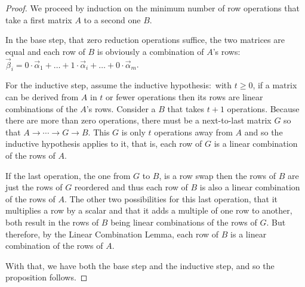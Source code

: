 \begin{proof}
We proceed by induction on the minimum number of row operations that take a
first matrix $A$ to a second one $B$.

In the base step, that
zero reduction operations suffice, the two matrices are equal and each 
row of $B$ is obviously a combination of
$A$'s rows: $\vec{\beta}_i
  =0\cdot\vec{\alpha}_1+\dots+1\cdot\vec{\alpha}_i+\dots+0\cdot\vec{\alpha}_m$.

For the inductive step, assume the inductive hypothesis:~with $t\geq 0$,
if a matrix can be derived from \( A \) in \( t \) or fewer operations 
then its rows are linear combinations of the $A$'s rows.
Consider a $B$ that takes $t+1$ operations.
Because there are more than zero operations, 
there must be a next-to-last matrix $G$  
so that $A\longrightarrow\cdots\longrightarrow G\longrightarrow B$.
This \( G \) is only $t$ operations away from \( A \) and so the inductive
hypothesis applies to it, that is, each row of \( G \)
is a linear combination of the rows of \( A \).

If the last operation, the one from \( G \) to \( B \), is a row swap then
the rows of $B$ are just the rows of $G$ reordered and thus each row of $B$
is also a linear combination of the rows of $A$.
The other two possibilities for this last operation, that it multiplies a 
row by a scalar and that it adds a multiple of one row to another, both result
in the rows of $B$ being linear combinations of the rows of $G$.
But therefore, by the Linear Combination Lemma, each row of $B$ is a linear
combination of the rows of $A$.


With that, we have both the base step and the inductive step, and 
so the proposition follows.
\end{proof}

